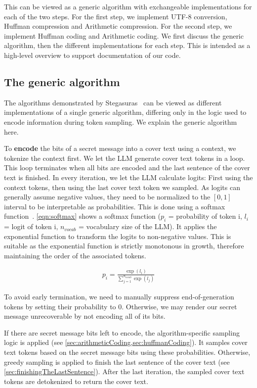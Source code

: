This can be viewed as a generic algorithm with exchangeable implementations for each of the two steps. For the first step, we implement UTF-8 conversion, Huffman compression and Arithmetic compression. For the second step, we implement Huffman coding and Arithmetic coding. We first discuss the generic algorithm, then the different implementations for each step. This is intended as a high-level overview to support documentation of our code.

\subsection{The generic algorithm}
\label{sec:theGenericAlgorithm}
The algorithms demonstrated by Stegasuras~\cite{zieglerNeuralLinguisticSteganography2019} can be viewed as different implementations of a single generic algorithm, differing only in the logic used to encode information during token sampling. We explain the generic algorithm here.

To \textbf{encode} the bits of a secret message into a cover text using a context, we tokenize the context first. We let the \gls{LLM} generate cover text tokens in a loop. This loop terminates when all bits are encoded and the last sentence of the cover text is finished. In every iteration, we let the \gls{LLM} calculate logits: First using the context tokens, then using the last cover text token we sampled. As logits can generally assume negative values, they need to be normalized to the $ [0, 1] $ interval to be interpretable as probabilities. This is done using a softmax function~\cite{turnerIntroductionTransformers2024}. \cref{eqn:softmax} shows a softmax function ($p_i$ = probability of token i, $l_i$ = logit of token i, $n_{vocab}$ = vocabulary size of the \gls{LLM}). It applies the exponential function to transform the logits to non-negative values. This is suitable as the exponential function is strictly monotonous in growth, therefore maintaining the order of the associated tokens.

\begin{align}
	p_i = \frac{\exp(l_i)}{\sum_{j=1}^{n_{vocab}} \exp(l_j)}
	\label{eqn:softmax}
\end{align}

To avoid early termination, we need to manually suppress end-of-generation tokens by setting their probability to 0. Otherwise, we may render our secret message unrecoverable by not encoding all of its bits.

If there are secret message bits left to encode, the algorithm-specific sampling logic is applied (see \cref{sec:arithmeticCoding,sec:huffmanCoding}). It samples cover text tokens based on the secret message bits using these probabilities. Otherwise, greedy sampling is applied to finish the last sentence of the cover text (see \cref{sec:finishingTheLastSentence}). After the last iteration, the sampled cover text tokens are detokenized to return the cover text.

